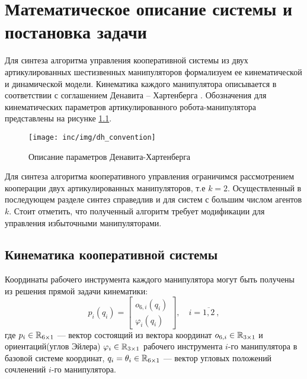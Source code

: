 \chapter{Математическое описание системы и постановка задачи}
\label{cha:design}

Для синтеза алгоритма управления кооперативной системы из двух артикулированных шестизвенных манипуляторов формализуем ее кинематической и динамической модели. Кинематика каждого манипулятора описывается в соответствии с соглашением Денавита – Хартенберга \cite{Spong2006}.
Обозначения для кинематических параметров артикулированного робота-манипулятора представлены на рисунке \ref{fig:dh_convention}.

\begin{figure}[ht!]
  \centering
  \texttt{[image: inc/img/dh\_convention]}
  \caption{Описание параметров Денавита-Хартенберга}
  \label{fig:dh_convention}
\end{figure}

Для синтеза алгоритма кооперативного управления ограничимся рассмотрением кооперации двух артикулированных манипуляторов, т.е $k=2$. Осуществленный в последующем разделе синтез справедлив и для систем с большим числом агентов $k$. Стоит отметить, что полученный алгоритм требует модификации для управления избыточными манипуляторами.

\section{Кинематика кооперативной системы}
\label{coop_kin}
Координаты рабочего инструмента каждого манипулятора могут быть получены из решения прямой задачи кинематики:
\begin{equation}
  p_i(q_i) = \begin{bmatrix}  o_{6,i}(q_i) \\ \varphi_i(q_i) \end{bmatrix},\quad i = \overline{1,2}\ ,
\end{equation}
где $p_i \in \mathbb{R}_{6\times1}$ --- вектор состоящий из вектора координат $o_{6,i} \in \mathbb{R}_{3\times1}$ и ориентаций(углов Эйлера) $\varphi_i \in \mathbb{R}_{3\times1}$ рабочего инструмента $i$-го манипулятора в базовой системе координат, $q_i=\theta_i \in \mathbb{R}_{6\times 1}$ --- вектор угловых положений сочленений $i$-го манипулятора.\\

